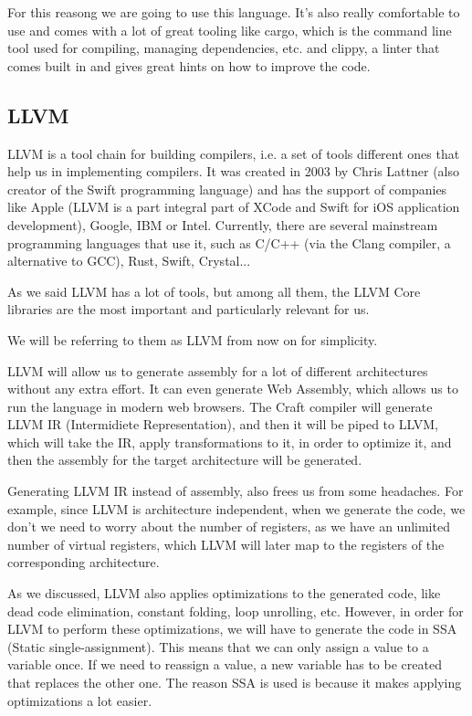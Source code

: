﻿\documentclass[10pt,a4paper,twocolumn,twoside]{article}
\begin{document}
For this reasong we are going to use this language. It's also really comfortable
to use and comes with a lot of great tooling like cargo, which is the command 
line tool used for compiling, managing dependencies, etc. and clippy, a linter
that comes built in and gives great hints on how to improve the code.

\subsection{LLVM}
LLVM is a tool chain for building compilers, i.e. a set of tools different ones
that help us in implementing compilers. It was created in 2003 by Chris Lattner
(also creator of the Swift programming language) and has the support of
companies like Apple (LLVM is a part integral part of XCode and Swift for iOS
application development), Google, IBM or Intel. Currently, there are several
mainstream programming languages that use it, such as C/C++ (via the Clang
compiler, a alternative to GCC), Rust, Swift, Crystal...

As we said LLVM has a lot of tools, but among all them, the LLVM Core libraries
are the most important and particularly relevant for us. 

We will be referring to 
them as LLVM from now on for simplicity. 

LLVM will allow us to generate assembly for a lot of different architectures
without any extra effort. It can even generate Web Assembly, which allows us to
run the language in modern web browsers. The Craft compiler will generate LLVM
IR (Intermidiete Representation), and then it will be piped to LLVM, which will
take the IR, apply transformations to it, in order to optimize it, and then
the assembly for the target architecture will be generated.

Generating LLVM IR instead of assembly, also frees us from some headaches. For
example, since LLVM is architecture independent, when we generate the code, we
don't we need to worry about the number of registers, as we have an unlimited
number of virtual registers, which LLVM will later map to the registers of the
corresponding architecture.

As we discussed, LLVM also applies optimizations to the generated code, like
dead code elimination, constant folding, loop unrolling, etc. However, in order
for LLVM to perform these optimizations, we will have to generate the code in
SSA (Static single-assignment). This means that we can only assign a value to a
variable once. If we need to reassign a value, a new variable has to be created
that replaces the other one. The reason SSA is used is because it makes 
applying optimizations a lot easier.
\end{document}
